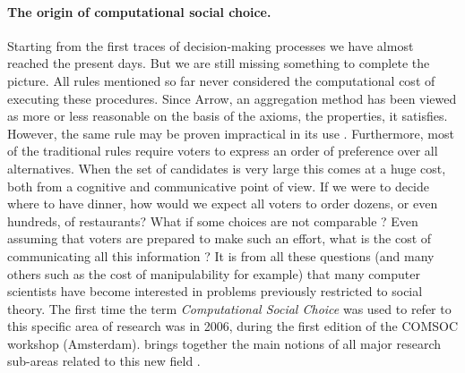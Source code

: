 \paragraph{The origin of computational social choice.}
Starting from the first traces of decision-making processes we have almost reached the present days. But we are still missing something to complete the picture. All rules mentioned so far never considered the computational cost of executing these procedures.
Since Arrow, an aggregation method has been viewed as more or less reasonable on the basis of the axioms, the properties, it satisfies. However, the same rule may be proven impractical in its use \citep{Bartholdi1989,Rothe2003,Hemaspaandra2005,Davenport2004}.
Furthermore, most of the traditional rules require voters to express an order of preference over all alternatives. When the set of candidates is very large this comes at a huge cost, both from a cognitive and communicative point of view.
If we were to decide where to have dinner, how would we expect all voters to order dozens, or even hundreds, of restaurants? What if some choices are not comparable \citep{Pini2007}? 
Even assuming that voters are prepared to make such an effort, what is the cost of communicating all this information \citep{Lang2004,Conitzer2005}?
It is from all these questions (and many others such as the cost of manipulability for example) that many computer scientists have become interested in problems previously restricted to social theory.
The first time the term \textit{Computational Social Choice} was used to refer to this specific area of research was in 2006, during the first edition of the COMSOC workshop (Amsterdam).
\textit{} brings together the main notions of all major research sub-areas related to this new field \citep{Comsoc2016}.

